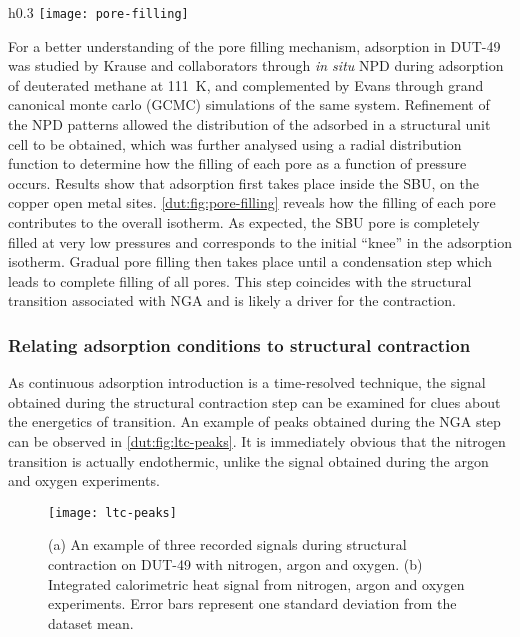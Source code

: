 \begin{wrapfigure}{h}{0.3\textwidth}
	\centering
	\texttt{[image: pore-filling]}%
    \caption{A dissection of the experimental and simulated 
     isotherm at \SI{111}{\kelvin} 
    in components of adsorption in each type of pore.
    Data obtained by Krause and Evans.}%
	\label{dut:fig:pore-filling}
\end{wrapfigure}
For a better understanding of the pore filling mechanism, adsorption
in DUT-49 was studied by Krause and collaborators 
through \textit{in situ} \gls{NPD} during adsorption of
deuterated methane  at \SI{111}{\kelvin},
and complemented by Evans through grand canonical monte carlo
(GCMC) simulations of the same system. 
Refinement of the \gls{NPD} patterns allowed the distribution
of the adsorbed  in a structural unit cell to be obtained, which
was further analysed using a radial distribution function to determine
how the filling of each pore as a function of pressure occurs. 
Results show that adsorption first takes place inside the \gls{SBU},
on the copper open metal sites.
\autoref{dut:fig:pore-filling} reveals how
the filling of each pore contributes to the overall isotherm.
As expected, the \gls{SBU} pore is completely filled at very low pressures
and corresponds to the initial ``knee'' in the adsorption isotherm. Gradual
pore filling then takes place until a condensation step which 
leads to complete filling of all pores. This step coincides with 
the structural transition associated with NGA and is likely a driver 
for the contraction.

\subsubsection{Relating adsorption conditions to structural contraction}

As continuous adsorption introduction is a time-resolved technique, 
the signal obtained during the structural contraction step can 
be examined for clues about the energetics of transition. An example 
of peaks obtained during the NGA step can be observed in 
\autoref{dut:fig:ltc-peaks}. It is immediately obvious that 
the nitrogen transition is actually endothermic, unlike the 
signal obtained during the argon and oxygen experiments.

\begin{figure}[htb]
    \centering
    \texttt{[image: ltc-peaks]}%
    \caption{(a) An example of three recorded signals during 
    structural contraction on DUT-49 with nitrogen, argon and 
    oxygen. (b) Integrated calorimetric heat signal from 
    nitrogen, argon and oxygen experiments. Error bars 
    represent one standard deviation from the dataset mean.}%
    \label{dut:fig:ltc-peaks}
\end{figure}

